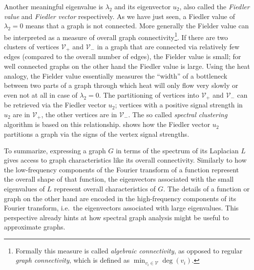 Another meaningful eigenvalue is $\lambda_2$ and its eigenvector $u_2$, also called the \textit{Fiedler value} and \textit{Fiedler vector} respectively.
As we have just seen, a Fiedler value of $\lambda_2 = 0$ means that a graph is not connected.
More generally the Fielder value can be interpreted as a measure of overall graph connectivity\footnote{%
	Formally this measure is called \textit{algebraic connectivity}, as opposed to regular \textit{graph connectivity}, which is defined as $\min_{v_i \in \mathcal{V}} \deg(v_i)$.
}.
If there are two clusters of vertices $\mathcal{V}_+$ and $\mathcal{V}_-$ in a graph that are connected via relatively few edges (compared to the overall number of edges), the Fielder value is small;
for well connected graphs on the other hand the Fiedler value is large.
Using the heat analogy, the Fielder value essentially measures the ``width'' of a bottleneck between two parts of a graph through which heat will only flow very slowly or even not at all in case of $\lambda_2 = 0$.
The partitioning of vertices into $\mathcal{V}_+$ and $\mathcal{V}_-$ can be retrieved via the Fiedler vector $u_2$;
vertices with a positive signal strength in $u_2$ are in $\mathcal{V}_+$, the other vertices are in $\mathcal{V}_-$.
The so called \textit{spectral clustering} algorithm is based on this relationship.
 shows how the Fiedler vector $u_2$ partitions a graph via the signs of the vertex signal strengths.

To summarize, expressing a graph $G$ in terms of the spectrum of its Laplacian $L$ gives access to graph characteristics like its overall connectivity.
Similarly to how the low-frequency components of the Fourier transform of a function represent the overall shape of that function, the eigenvectors associated with the small eigenvalues of $L$ represent overall characteristics of $G$.
The details of a function or graph on the other hand are encoded in the high-frequency components of its Fourier transform, i.e.\  the eigenvectors associated with large eigenvalues.
This perspective already hints at how spectral graph analysis might be useful to approximate graphs.
